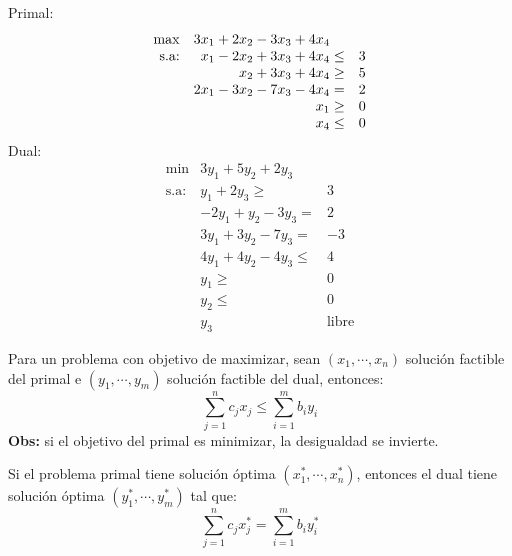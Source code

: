 \documentclass[10pt, aspectratio=169,usenames,dvipsnames]{beamer}
\begin{document}
\begin{frame}{}
    Primal:
        \[
    \begin{array}{rrl}
        \max & \multicolumn{2}{l}{3x_1+2x_2-3x_3+4x_4}  \\
        \text{s.a:} & x_1-2x_2+3x_3+4x_4 \leq & 3 \\
         & x_2+3x_3+4x_4 \geq & 5 \\
         & 2x_1-3x_2-7x_3-4x_4 = & 2 \\
         & x_1 \geq & 0 \\
         & x_4 \leq & 0
    \end{array}
    \]
    Dual:
    \[
    \begin{array}{rrl}
        \min & 3y_1+5y_2+2y_3 \\
        \text{s.a:} & y_1+2y_3 \geq & 3 \\
         & -2y_1+y_2-3y_3 = & 2 \\
         & 3y_1+3y_2-7y_3= & -3 \\
         & 4y_1+4y_2-4y_3 \leq & 4 \\
         & y_1\geq & 0 \\
         & y_2\leq & 0 \\
         & y_3 & \text{libre}
    \end{array}\]
\end{frame}

\begin{frame}{}
\vspace{1em}
\begin{tcolorbox}[title=Teorema débil de dualidad]
Para un problema con objetivo de maximizar, sean $(x_1,\cdots,x_n)$ solución factible del primal e $(y_1,\cdots, y_m)$ solución factible del dual, entonces:
\[ \displaystyle \sum_{j=1}^n c_jx_j \leq \sum_{i=1}^m b_iy_i\]
\footnotesize{\textbf{Obs:} si el objetivo del primal es minimizar, la desigualdad se invierte.}
\end{tcolorbox}

\begin{tcolorbox}[title= Teorema fundamental de dualidad]
Si el problema primal tiene solución óptima $(x_1^{\ast},\cdots,x_n^{\ast})$, entonces el dual tiene solución óptima $(y_1^{\ast},\cdots,y_m^{\ast})$ tal que:
\[ \displaystyle \sum_{j=1}^n c_jx_j^{\ast} = \sum_{i=1}^m b_iy_i^{\ast}\]
\end{tcolorbox}
\end{frame}
\end{document}
